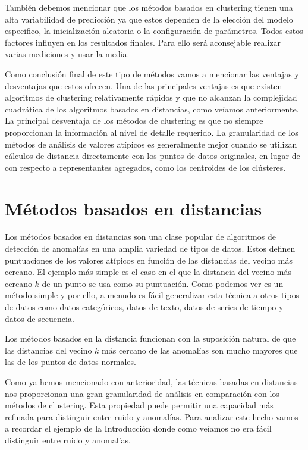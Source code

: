 También debemos mencionar que los métodos basados en clustering tienen una alta
variabilidad de predicción ya que estos dependen de la elección del modelo especifico,
la inicialización aleatoria o la configuración de parámetros. Todos estos 
factores influyen en los resultados finales. Para ello será aconsejable realizar
varias mediciones y usar la media.

Como conclusión final de este tipo de métodos vamos a mencionar las ventajas
y desventajas que estos ofrecen. Una de las principales ventajas es que existen
algoritmos de clustering relativamente rápidos y que no alcanzan la complejidad
cuadrática de los algoritmos basados en distancias, como veíamos anteriormente.
La principal desventaja de los métodos de clustering es que no siempre proporcionan
la información al nivel de detalle requerido. La granularidad de los métodos de análisis
de valores atípicos es generalmente mejor cuando se utilizan cálculos de
distancia directamente con los puntos de datos originales, en lugar de con
respecto a representantes agregados, como los centroides de los clústeres.



\section{Métodos basados en distancias}
Los métodos basados en distancias son una clase popular de algoritmos 
de detección de anomalías en una amplia variedad de tipos de datos.
Estos definen puntuaciones de los valores atípicos en función de las 
distancias del vecino más cercano. El ejemplo más simple es el caso en 
el que la distancia del vecino más cercano $k$ de un punto se
usa como su puntuación. Como podemos ver es un método simple y por ello,
a menudo es fácil generalizar esta técnica a otros tipos de datos como 
datos categóricos, datos de texto, datos de series de tiempo y datos de 
secuencia.

Los métodos basados en la distancia funcionan con la suposición natural 
de que las distancias del vecino $k$ más cercano de las anomalías
son mucho mayores que las de los puntos de datos normales.


Como ya hemos mencionado con anterioridad, las técnicas basadas en distancias
nos proporcionan una gran granularidad de análisis en comparación con los métodos
de clustering. Esta propiedad puede permitir una capacidad más refinada 
para distinguir entre ruido y anomalías. Para analizar este hecho vamos a
recordar el ejemplo de la Introducción donde como veíamos no era fácil
distinguir entre ruido y anomalías.


